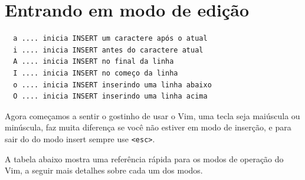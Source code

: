 \documentclass[10pt,a4paper,openany]{book}
\begin{document}
\section{Entrando em modo de edição}
\label{Entrando em modo de edição}

\begin{verbatim}
  a .... inicia INSERT um caractere após o atual
  i .... inicia INSERT antes do caractere atual
  A .... inicia INSERT no final da linha
  I .... inicia INSERT no começo da linha
  o .... inicia INSERT inserindo uma linha abaixo
  O .... inicia INSERT inserindo uma linha acima
\end{verbatim}

Agora começamos a sentir o gostinho de usar o Vim, uma tecla seja
maiúscula ou minúscula, faz muita diferença se você não estiver em
modo de inserção, e para sair do do modo insert sempre use \verb|<esc>|.

A tabela abaixo mostra uma referência rápida para os modos de operação do Vim,
a seguir mais detalhes sobre cada um dos modos.
\end{document}
